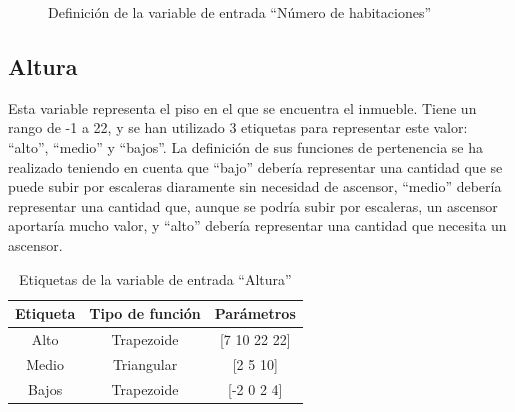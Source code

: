 \documentclass[12pt]{report} %
\begin{document}
        \begin{figure}[H]
            \centering
            \caption{Definición de la variable de entrada ``Número de habitaciones''}
        \end{figure}

        \subsection{Altura}
        Esta variable representa el piso en el que se encuentra el inmueble.
        Tiene un rango de -1 a 22, y se han utilizado 3 etiquetas para representar este valor: ``alto'', ``medio'' y ``bajos''.
        La definición de sus funciones de pertenencia se ha realizado teniendo en cuenta que ``bajo'' debería representar una cantidad que se puede subir por escaleras diaramente sin necesidad de ascensor,
        ``medio'' debería representar una cantidad que, aunque se podría subir por escaleras, un ascensor aportaría mucho valor, y ``alto'' debería representar una cantidad que necesita un ascensor.

        \begin{table}[h]
            \center
            \begin{tabular}{@{}ccc@{}}
                \toprule
                \textbf{Etiqueta} & \textbf{Tipo de función} & \textbf{Parámetros} \\
                \midrule
                Alto  & Trapezoide & [7 10 22 22] \\
                Medio & Triangular & [2 5 10]     \\
                Bajos & Trapezoide & [-2 0 2 4]   \\
                \bottomrule
            \end{tabular}
            \caption{Etiquetas de la variable de entrada ``Altura''}
        \end{table}
\end{document}
